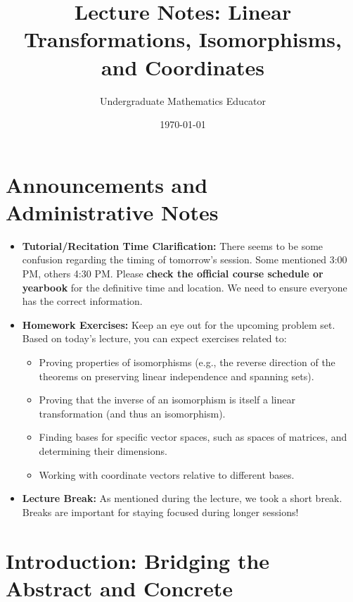 \documentclass[11pt, letterpaper]{article}
\title{Lecture Notes: Linear Transformations, Isomorphisms, and Coordinates}
\author{Undergraduate Mathematics Educator} %
\date{\today} %
\theoremstyle{mytheoremstyle}
\theoremstyle{mydefinitionstyle}
\theoremstyle{myremarkstyle}
\begin{document}
\maketitle

\section*{Announcements and Administrative Notes}
\begin{itemize}
    \item \textbf{Tutorial/Recitation Time Clarification:} There seems to be some confusion regarding the timing of tomorrow's session. Some mentioned 3:00 PM, others 4:30 PM. Please \textbf{check the official course schedule or yearbook} for the definitive time and location. We need to ensure everyone has the correct information.
    \item \textbf{Homework Exercises:} Keep an eye out for the upcoming problem set. Based on today's lecture, you can expect exercises related to:
        \begin{itemize}
            \item Proving properties of isomorphisms (e.g., the reverse direction of the theorems on preserving linear independence and spanning sets).
            \item Proving that the inverse of an isomorphism is itself a linear transformation (and thus an isomorphism).
            \item Finding bases for specific vector spaces, such as spaces of matrices, and determining their dimensions.
            \item Working with coordinate vectors relative to different bases.
        \end{itemize}
    \item \textbf{Lecture Break:} As mentioned during the lecture, we took a short break. Breaks are important for staying focused during longer sessions!
\end{itemize}
\hrulefill %
\vspace{1em}


\section{Introduction: Bridging the Abstract and Concrete}
\end{document}
